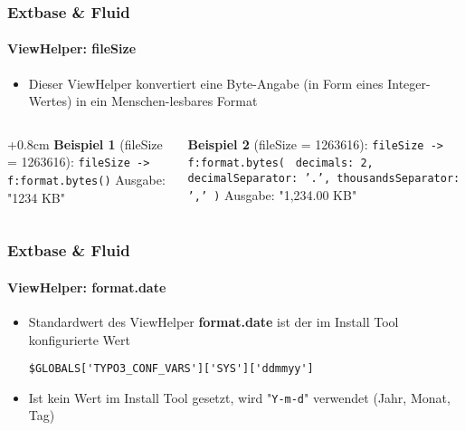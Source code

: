 \begin{frame}[fragile]
	\frametitle{Extbase \& Fluid}
	\framesubtitle{ViewHelper: fileSize}

	\begin{itemize}
		\item Dieser ViewHelper konvertiert eine Byte-Angabe (in Form eines Integer-Wertes) in ein Menschen-lesbares Format
	\end{itemize}

	\begin{columns}[T]

		\begin{column}{.5\textwidth}
			\advance\leftskip+0.8cm
			\smaller
				\textbf{Beispiel 1} (fileSize = 1263616):\newline
				\texttt{fileSize -> f:format.bytes()}\newline
				\newline
				Ausgabe: "1234 KB"
			\normalsize
		\end{column}
		\begin{column}{.5\textwidth}
			\smaller
				\textbf{Beispiel 2} (fileSize = 1263616):\newline
				\texttt{fileSize -> f:format.bytes(}\newline
				\texttt{
				decimals: 2,\newline
				decimalSeparator: '.',\newline
				thousandsSeparator: ','\newline
				)}\newline
				\newline
				Ausgabe: "1,234.00 KB"
			\normalsize
		\end{column}

	\end{columns}

\end{frame}


\begin{frame}[fragile]
	\frametitle{Extbase \& Fluid}
	\framesubtitle{ViewHelper: format.date}

	\lstset{
		basicstyle=\smaller\ttfamily
	}

	\begin{itemize}
		\item Standardwert des ViewHelper \textbf{format.date} ist der im Install Tool konfigurierte Wert

			\lstinline!$GLOBALS['TYPO3_CONF_VARS']['SYS']['ddmmyy']!

		\item Ist kein Wert im Install Tool gesetzt, wird "\texttt{Y-m-d}" verwendet (Jahr, Monat, Tag)

	\end{itemize}

\end{frame}

